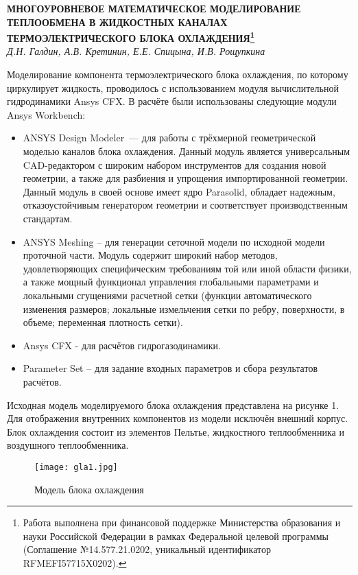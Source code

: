 \begin{center}{ \bf  МНОГОУРОВНЕВОЕ МАТЕМАТИЧЕСКОЕ МОДЕЛИРОВАНИЕ ТЕПЛООБМЕНА В ЖИДКОСТНЫХ КАНАЛАХ ТЕРМОЭЛЕКТРИЧЕСКОГО БЛОКА ОХЛАЖДЕНИЯ\footnote{Работа выполнена при финансовой поддержке Министерства образования и науки Российской Федерации в рамках Федеральной целевой программы (Соглашение №14.577.21.0202, уникальный идентификатор RFMEFI57715X0202).}}\\
{\it Д.Н. Галдин, А.В. Кретинин, Е.Е. Спицына, И.В. Рощупкина} \\
\end{center}

Моделирование компонента термоэлектрического блока охлаждения, по которому циркулирует жидкость, проводилось с использованием модуля вычислительной гидродинамики Ansys CFX.
В расчёте были использованы следующие модули Ansys Workbench:
\begin{itemize}
	\item
		ANSYS Design Modeler~--- для работы с трёхмерной геометрической моделью каналов блока охлаждения.
		Данный модуль является универсальным CAD-ре\-да\-к\-то\-ром с широким набором инструментов для создания новой геометрии, а также для разбиения и упрощения импортированной геометрии. Данный модуль в своей основе имеет ядро Parasolid, обладает надежным, отказоустойчивым генератором геометрии и соответствует производственным стандартам.
	\item
		ANSYS Meshing – для генерации сеточной модели по исходной модели проточной части. Модуль содержит широкий набор методов, удовлетворяющих специфическим требованиям той или иной области физики, а также мощный функционал управления глобальными параметрами и локальными сгущениями расчетной сетки (функции автоматического изменения размеров; локальные измельчения сетки по ребру, поверхности, в объеме; переменная плотность сетки).
	\item
		Ansys CFX - для расчётов гидрогазодинамики.
	\item
		Parameter Set – для задание входных параметров и сбора результатов расчётов.
\end{itemize}
Исходная модель моделируемого блока охлаждения представлена на рисунке 1. Для отображения внутренних компонентов из модели исключён внешний корпус. Блок охлаждения состоит из элементов Пельтье, жидкостного теплообменника и воздушного теплообменника.

\begin{figure}[h!]
	\centering
	\texttt{[image: gla1.jpg]}
	\caption{Модель блока охлаждения}
\end{figure}


